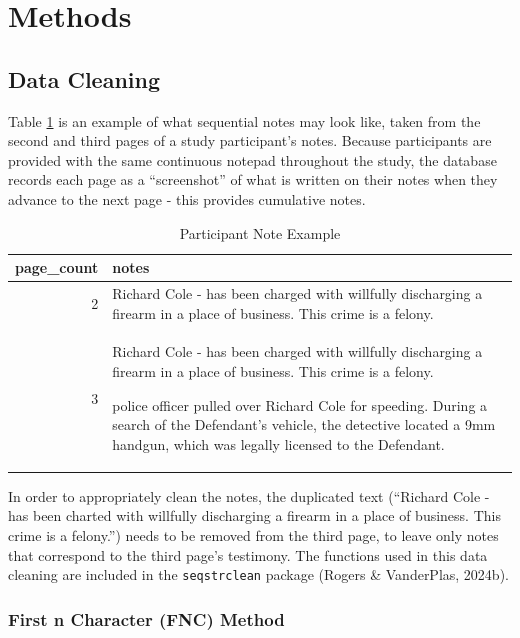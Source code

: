 \documentclass[print]{nuthesis}
\begin{document}
\hypertarget{methods-1}{%
\section{Methods}\label{methods-1}}

\hypertarget{data-cleaning}{%
\subsection{Data Cleaning}\label{data-cleaning}}

Table \ref{tab:noteexample} is an example of what sequential notes may look like, taken from the second and third pages of a study participant's notes.
Because participants are provided with the same continuous notepad throughout the study, the database records each page as a ``screenshot'' of what is written on their notes when they advance to the next page - this provides cumulative notes.

\begin{table}

\caption{\label{tab:noteexample}Participant Note Example}
\centering
\begin{tabular}[t]{r|l}
\hline
page\_count & notes\\
\hline
2 & Richard Cole - has been charged with willfully discharging a firearm in a place of business. This crime is a felony.\\
\hline
3 & Richard Cole - has been charged with willfully discharging a firearm in a place of business. This crime is a felony. 

police officer pulled over Richard Cole for speeding. During a search of the Defendant's vehicle, the detective located a 9mm handgun, which was legally licensed to the Defendant.\\
\hline
\end{tabular}
\end{table}

In order to appropriately clean the notes, the duplicated text (``Richard Cole - has been charted with willfully discharging a firearm in a place of business. This crime is a felony.'') needs to be removed from the third page, to leave only notes that correspond to the third page's testimony.
The functions used in this data cleaning are included in the \texttt{seqstrclean} package (Rogers \& VanderPlas, 2024b).

\hypertarget{first-n-character-fnc-method}{%
\subsubsection{First n Character (FNC) Method}\label{first-n-character-fnc-method}}
\end{document}
